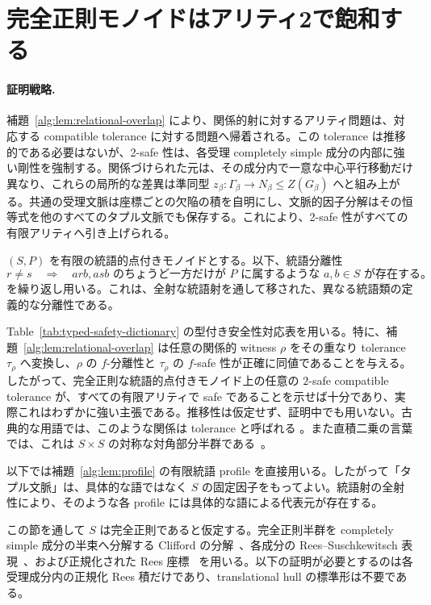 \documentclass[10pt,a4paper]{ltjsarticle}
\theoremstyle{definition}
\theoremstyle{remark}
\begin{document}
\section{完全正則モノイドはアリティ2で飽和する}
\label{sec:cr-saturation}

\paragraph{証明戦略.}
補題~\ref{alg:lem:relational-overlap} により、関係的射に対するアリティ問題は、対応する compatible tolerance に対する問題へ帰着される。この tolerance は推移的である必要はないが、2-safe 性は、各受理 completely simple 成分の内部に強い剛性を強制する。関係づけられた元は、その成分内で一意な中心平行移動だけ異なり、これらの局所的な差異は準同型
\(z_\beta:\Gamma_\beta\to N_\beta\le Z(G_\beta)\)
へと組み上がる。共通の受理文脈は座標ごとの欠陥の積を自明にし、文脈的因子分解はその恒等式を他のすべてのタプル文脈でも保存する。これにより、2-safe 性がすべての有限アリティへ引き上げられる。

$(S,P)$ を有限の統語的点付きモノイドとする。以下、統語分離性
\[
 r\ne s
 \quad\Longrightarrow\quad
 \text{$arb,asb$ のちょうど一方だけが $P$ に属するような $a,b\in S$ が存在する。}
\tag{Syn}
\]
を繰り返し用いる。これは、全射な統語射を通して移された、異なる統語類の定義的な分離性である。

Table~\ref{tab:typed-safety-dictionary} の型付き安全性対応表を用いる。特に、補題~\ref{alg:lem:relational-overlap} は任意の関係的 witness \(\rho\) をその重なり tolerance \(\tau_\rho\) へ変換し、\(\rho\) の $f$-分離性と \(\tau_\rho\) の $f$-safe 性が正確に同値であることを与える。したがって、完全正則な統語的点付きモノイド上の任意の $2$-safe compatible tolerance が、すべての有限アリティで safe であることを示せば十分であり、実際これはわずかに強い主張である。推移性は仮定せず、証明中でも用いない。古典的な用語では、このような関係は tolerance と呼ばれる
\cite{ZelinkaTolerance1975,Pondelicek1978,KumaresanTolerance1984}。また直積二乗の言葉では、これは $S\times S$ の対称な対角部分半群である~\cite{BarberRuskucDirectSquare,BarberRuskucDiagonal2026}。

以下では補題~\ref{alg:lem:profile} の有限統語 profile を直接用いる。したがって「タプル文脈」は、具体的な語ではなく $S$ の固定因子をもってよい。統語射の全射性により、そのような各 profile には具体的な語による代表元が存在する。

この節を通して $S$ は完全正則であると仮定する。完全正則半群を completely simple 成分の半束へ分解する Clifford の分解~\cite[Theorem~4.1.3]{Howie1995}、各成分の Rees--Suschkewitsch 表現~\cite[Theorem~3.3.1]{Howie1995}、および正規化された Rees 座標~\cite[Theorem~3.4.2]{Howie1995} を用いる。以下の証明が必要とするのは各受理成分内の正規化 Rees 積だけであり、translational hull の標準形は不要である。
\end{document}
